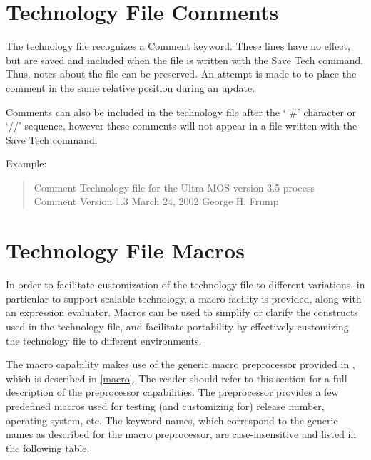 \section{Technology File Comments}

The technology file recognizes a {\vt Comment} keyword.  These lines have
no effect, but are saved and included when the file is written with
the {\cb Save Tech} command.  Thus, notes about the file can be preserved. 
An attempt is made to to place the comment in the same relative
position during an update.

Comments can also be included in the technology file after the `{\vt
\#}' character or `{\vt //}' sequence, however these comments will not
appear in a file written with the {\cb Save Tech} command.

Example:
\begin{quote} \vt
Comment  Technology file for the Ultra-MOS version 3.5 process\\
Comment  Version 1.3  March 24, 2002  George H. Frump
\end{quote}


\section{Technology File Macros}
\label{techmacros}

In order to facilitate customization of the technology file to
different variations, in particular to support scalable technology, a
macro facility is provided, along with an expression evaluator. 
Macros can be used to simplify or clarify the constructs used in the
technology file, and facilitate portability by effectively customizing
the technology file to different environments.

The macro capability makes use of the generic macro preprocessor
provided in {\Xic}, which is described in \ref{macro}.  The reader
should refer to this section for a full description of the
preprocessor capabilities.  The preprocessor provides a few predefined
macros used for testing (and customizing for) release number,
operating system, etc.  The keyword names, which correspond to the
generic names as described for the macro preprocessor, are
case-insensitive and listed in the following table.

